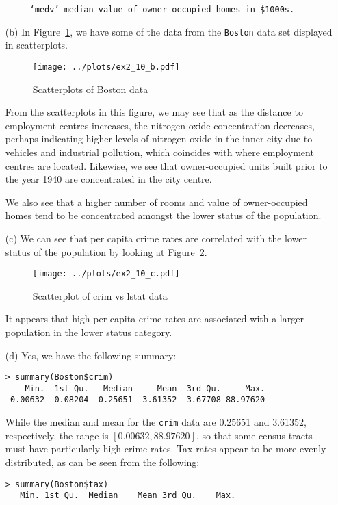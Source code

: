 \begin{itemize}
\begin{verbatim}
     ‘medv’ median value of owner-occupied homes in $1000s.
    \end{verbatim}\normalsize
\item[(b)] In Figure~\ref{fig2_10scat}, we have some of the data from the 
    \verb|Boston| data set displayed in scatterplots.\par
    \begin{figure}[!ht]
        \texttt{[image: ../plots/ex2\_10\_b.pdf]}
        \caption{Scatterplots of Boston data \label{fig2_10scat}}
    \end{figure}
    \qquad From the scatterplots in this figure, we may see that as the distance to 
    employment centres increases, the nitrogen oxide concentration decreases,
    perhaps indicating higher levels of nitrogen oxide in the inner city due
    to vehicles and industrial pollution, which coincides with where employment
    centres are located. Likewise, we see that owner-occupied units built prior
    to the year 1940 are concentrated in the city centre.\par
    \qquad We also see that a higher number of rooms and value of owner-occupied 
    homes tend to be concentrated amongst the lower status of the population.
    \item[(c)] We can see that per capita crime rates are correlated with the
    lower status of the population by looking at Figure~\ref{fig8}.
    \begin{figure}[!ht]
        \texttt{[image: ../plots/ex2\_10\_c.pdf]}
        \caption{Scatterplot of crim vs lstat data \label{fig8}}
    \end{figure}
    It appears that high per capita crime rates are associated with a 
    larger population in the lower status category.
    \item[(d)] Yes, we have the following summary:
    \scriptsize\begin{verbatim}
> summary(Boston$crim)
    Min.  1st Qu.   Median     Mean  3rd Qu.     Max.
 0.00632  0.08204  0.25651  3.61352  3.67708 88.97620
    \end{verbatim}\normalsize
    While the median and mean for the \verb|crim| data are 
    0.25651 and 3.61352, respectively, the range is $[0.00632, 88.97620]$,
    so that some census tracts must have particularly high crime rates.
    Tax rates appear to be more evenly distributed, as can be seen from the
    following:
    \scriptsize\begin{verbatim}
> summary(Boston$tax)
   Min. 1st Qu.  Median    Mean 3rd Qu.    Max.

\end{verbatim}
\end{itemize}
